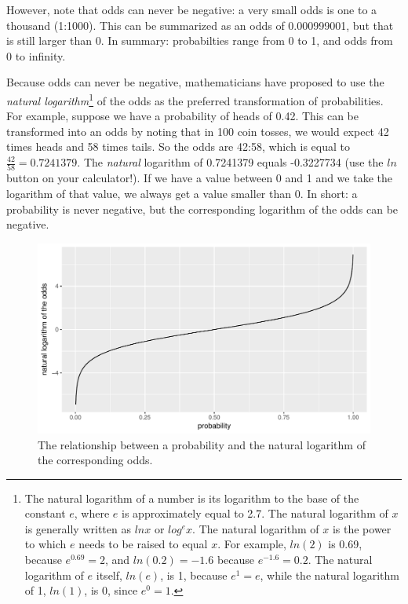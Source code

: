 \documentclass[]{report}\usepackage[]{graphicx}\usepackage[]{color}
\makeatletter
\def\maxwidth{ %
  \ifdim\Gin@nat@width>\linewidth
    \linewidth
  \else
    \Gin@nat@width
  \fi
}
\newenvironment{knitrout}{}{} %
\makeatother
\begin{document}
However, note that odds can never be negative: a very small odds is one to a thousand (1:1000). This can be summarized as an odds of 0.000999001, but that is still larger than 0. In summary: probabilties range from 0 to 1, and odds from 0 to infinity.

Because odds can never be negative, mathematicians have proposed to use the \textit{natural logarithm}\footnote{The natural logarithm of a number is its logarithm to the base of the constant $e$, where $e$ is approximately equal to 2.7. The natural logarithm of $x$ is generally written as
$ln x$ or $log^e x$. The natural logarithm of $x$ is the power to which $e$ needs to be raised to equal $x$. For example, $ln(2)$ is 0.69, because $e^{0.69} = 2$, and $ln(0.2)=-1.6$ because $e^{-1.6}=0.2$. The natural logarithm of $e$ itself, $ln(e)$, is 1, because $e^1 = e$, while the natural logarithm of 1, $ln(1)$, is 0, since $e^0 = 1$.} of the odds  as the preferred transformation of probabilities. For example, suppose we have a probability of heads of 0.42. This can be transformed into an odds by noting that in 100 coin tosses, we would expect 42 times heads and 58 times tails. So the odds are 42:58, which is equal to $\frac{42}{58}=0.7241379$. The \textit{natural} logarithm of 0.7241379 equals -0.3227734 (use the $ln$ button on your calculator!). If we have a value between 0 and 1 and we take the logarithm of that value, we always get a value smaller than 0. In short: a probability is never negative, but the corresponding logarithm of the odds can be negative.




\begin{knitrout}
\color{fgcolor}\begin{figure}

{\centering \includegraphics[width=\maxwidth]{figure/gen_8-1} 

}

\caption[The relationship between a probability and the natural logarithm of the corresponding odds]{The relationship between a probability and the natural logarithm of the corresponding odds.}\label{fig:gen_8}
\end{figure}


\end{knitrout}
\end{document}
